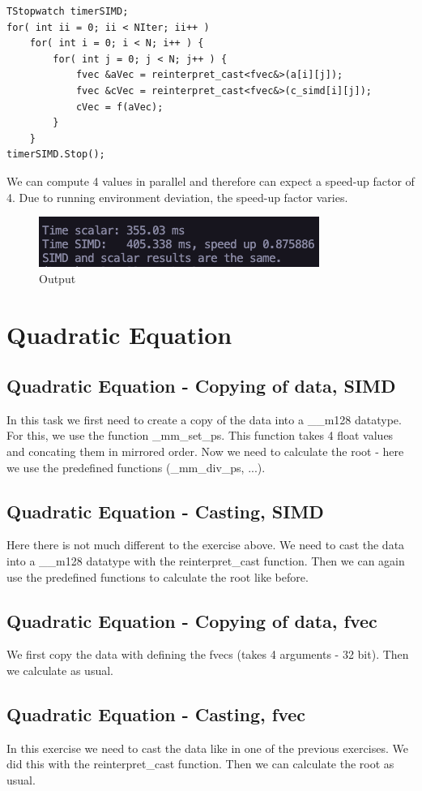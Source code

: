 \documentclass{article}
\begin{document}
\begin{lstlisting}[caption=Matrix.cpp]
TStopwatch timerSIMD;
for( int ii = 0; ii < NIter; ii++ )
    for( int i = 0; i < N; i++ ) {
        for( int j = 0; j < N; j++ ) {
            fvec &aVec = reinterpret_cast<fvec&>(a[i][j]);
            fvec &cVec = reinterpret_cast<fvec&>(c_simd[i][j]);
            cVec = f(aVec);
        }
    }
timerSIMD.Stop();
\end{lstlisting}

\noindent We can compute 4 values in parallel and therefore can expect a speed-up factor of 4. Due to running environment deviation, the speed-up factor varies.
\begin{figure}[H]
    \centering
    \includegraphics[scale=0.5]{matrix-output.png} 
    \caption{Output}
    \label{fig:example}
  \end{figure}
\section{Quadratic Equation}
\subsection{Quadratic Equation - Copying of data, SIMD}
In this task we first need to create a copy of the
data into a \_\_m128 datatype. For this, we use the
function \_mm\_set\_ps. This function takes 4 float values
and concating them in mirrored order.
Now we need to calculate the root - here we use
the predefined functions (\_mm\_div\_ps, ...).
\subsection{Quadratic Equation - Casting, SIMD}
Here there is not much different to the exercise above.
We need to cast the data into a \_\_m128 datatype with the
reinterpret\_cast function.
Then we can again use the predefined functions to calculate
the root like before.
\subsection{Quadratic Equation - Copying of data, fvec}
We first copy the data with defining the fvecs
(takes 4 arguments - 32 bit).
Then we calculate as usual.
\subsection{Quadratic Equation - Casting, fvec}
In this exercise we need to cast the data
like in one of the previous exercises. We
did this with the reinterpret\_cast function.
Then we can calculate the root as usual.
\end{document}
